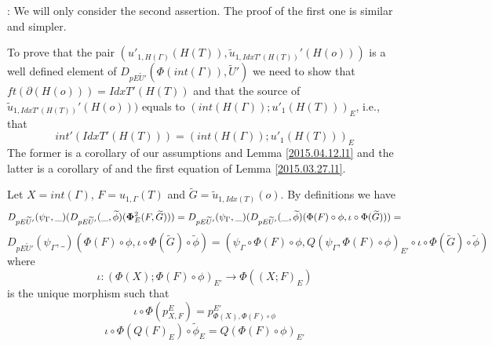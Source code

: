\documentclass[12pt]{article}
\newenvironment{myproof}{{\bf Proof}:}{\vskip 5mm }
\newcommand{\sr}{\rightarrow}
\newcommand{\wt}{\widetilde}
\begin{document}
\begin{myproof}
We will only consider the second assertion. The proof of the first one is similar and simpler.  

To prove that the pair $(u'_{1,H(\Gamma)}(H(T)), \wt{u}_{1,IdxT'(H(T))}'(H(o)))$ is a well defined element of $D_{pE\wt{U}'}(\Phi(int(\Gamma)),\wt{U}')$ we need to show that $ft(\partial(H(o)))=IdxT'(H(T))$ and that 
the source of $\wt{u}_{1,IdxT'(H(T))}'(H(o)))$ equals to 
$(int(H(\Gamma)); u'_1(H(T)))_{E}$, i.e., that
%
$$int'(IdxT'(H(T)))=(int(H(\Gamma)); u'_1(H(T)))_{E}$$
%
The former is a corollary of our assumptions and Lemma \ref{2015.04.12.l1} and the latter is a corollary of 
\cite[Problem 3.3(1)]{fromunivwithPi} and the first equation of Lemma \ref{2015.03.27.l1}. 

Let $X=int(\Gamma)$, $F=u_{1,\Gamma}(T)$ and $\wt{G}=\wt{u}_{1,Idx(T)}(o)$. By definitions we have 
%
$$D_{pE\wt{U}'}(\psi_{\Gamma},\_)(D_{pE\wt{U}'}(\_,\wt{\phi})({\bf\Phi}_{E}^2(F,\wt{G})))=D_{pE\wt{U}'}(\psi_{\Gamma},\_)(D_{pE\wt{U}'}(\_,\wt{\phi})(\Phi(F)\circ \phi, \iota\circ \Phi(\wt{G})))=$$
$$D_{pE\wt{U}'}(\psi_{\Gamma},\_)(\Phi(F)\circ \phi, \iota\circ \Phi(\wt{G})\circ\wt{\phi})=(\psi_{\Gamma}\circ\Phi(F)\circ \phi, Q(\psi_{\Gamma},\Phi(F)\circ\phi)_{E'}\circ\iota\circ \Phi(\wt{G})\circ\wt{\phi})$$
%
where 
%
$$\iota:(\Phi(X);\Phi(F)\circ \phi)_{E'}\sr \Phi((X;F)_{E})$$
%
is the unique morphism such that
%
$$\iota\circ \Phi(p^E_{X,F})=p^{E'}_{\Phi(X),\Phi(F)\circ\phi}$$
$$\iota\circ \Phi(Q(F)_E)\circ \wt{\phi}_E=Q(\Phi(F)\circ\phi)_{E'}$$
%


\end{myproof}
\end{document}
